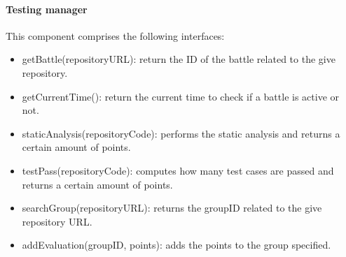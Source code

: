 \documentclass[12pt, a4paper]{report}
\begin{document}
    \paragraph*{Testing manager}
    This component comprises the following interfaces: 
    \begin{itemize}
        \item getBattle(repositoryURL): return the ID of the battle related to the give repository. 
        \item getCurrentTime(): return the current time to check if a battle is active or not. 
        \item staticAnalysis(repositoryCode): performs the static analysis and returns a certain amount of points. 
        \item testPass(repositoryCode): computes how many test cases are passed and returns a certain amount of points. 
        \item searchGroup(repositoryURL): returns the groupID related to the give repository URL. 
        \item addEvaluation(groupID, points): adds the points to the group specified. 
    \end{itemize}
\end{document}
